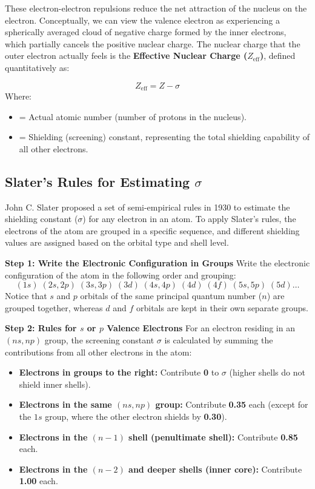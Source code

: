 \documentclass[12pt,a4paper]{article}
\begin{document}
These electron-electron repulsions reduce the net attraction of the nucleus on the electron. Conceptually, we can view the valence electron as experiencing a spherically averaged cloud of negative charge formed by the inner electrons, which partially cancels the positive nuclear charge. The nuclear charge that the outer electron actually feels is the \textbf{Effective Nuclear Charge ($Z_{\text{eff}}$)}, defined quantitatively as:

\begin{tcolorbox}[formulabox, title={Effective Nuclear Charge Equation}]
  \[ Z_{\text{eff}} = Z - \sigma \]
  Where:
  \begin{itemize}[leftmargin=1.5cm, itemsep=1pt]
    \item[$Z$] = Actual atomic number (number of protons in the nucleus).
    \item[$\sigma$] = Shielding (screening) constant, representing the total shielding capability of all other electrons.
  \end{itemize}
\end{tcolorbox}

\subsection{Slater's Rules for Estimating \texorpdfstring{$\sigma$}{sigma}}
John C. Slater proposed a set of semi-empirical rules in 1930 to estimate the shielding constant ($\sigma$) for any electron in an atom. To apply Slater's rules, the electrons of the atom are grouped in a specific sequence, and different shielding values are assigned based on the orbital type and shell level.

\textbf{Step 1: Write the Electronic Configuration in Groups}
Write the electronic configuration of the atom in the following order and grouping:
\[ (1s) \; (2s, 2p) \; (3s, 3p) \; (3d) \; (4s, 4p) \; (4d) \; (4f) \; (5s, 5p) \; (5d) \dots \]
Notice that $s$ and $p$ orbitals of the same principal quantum number ($n$) are grouped together, whereas $d$ and $f$ orbitals are kept in their own separate groups.

\textbf{Step 2: Rules for $s$ or $p$ Valence Electrons}
For an electron residing in an $(ns, np)$ group, the screening constant $\sigma$ is calculated by summing the contributions from all other electrons in the atom:
\begin{itemize}[leftmargin=*, itemsep=2pt]
  \item \textbf{Electrons in groups to the right:} Contribute \textbf{0} to $\sigma$ (higher shells do not shield inner shells).
  \item \textbf{Electrons in the same $(ns, np)$ group:} Contribute \textbf{0.35} each (except for the $1s$ group, where the other electron shields by \textbf{0.30}).
  \item \textbf{Electrons in the $(n-1)$ shell (penultimate shell):} Contribute \textbf{0.85} each.
  \item \textbf{Electrons in the $(n-2)$ and deeper shells (inner core):} Contribute \textbf{1.00} each.
\end{itemize}
\end{document}
